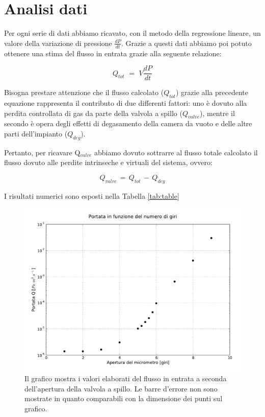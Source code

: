 \section{Analisi dati}

Per ogni serie di dati abbiamo ricavato, con il metodo della regressione lineare, un valore della variazione di pressione $\frac{dP}{dt}$. Grazie a questi dati abbiamo poi potuto ottenere una stima del flusso in entrata grazie alla seguente relazione:

\begin{equation}
	Q_{tot} \,\, = \,\, V \frac{dP}{dt}
\end{equation}

Bisogna prestare attenzione che il flusso calcolato ($Q_{tot}$) grazie alla precedente equazione rappresenta il contributo di due differenti fattori: uno è dovuto alla perdita controllata di gas da parte della valvola a spillo ($Q_{valve}$), mentre il secondo è opera degli effetti di degasamento della camera da vuoto e delle altre parti dell'impianto ($Q_{deg}$).

Pertanto, per ricavare Q$_{valve}$ abbiamo dovuto sottrarre al flusso totale calcolato il flusso  dovuto alle perdite intrinseche e virtuali del sistema, ovvero:

\begin{equation}
	Q_{valve} \, = \, Q_{tot} \, - \, Q_{deg}
\end{equation}

I risultati numerici sono esposti nella Tabella \ref{tab:table}

\begin{figure}[h!]
    \includegraphics[width=16cm]{graph.pdf}
    \caption{Il grafico mostra i valori elaborati del flusso in entrata a seconda dell'apertura della valvola a spillo. Le barre d'errore non sono
    mostrate in quanto comparabili con la dimensione dei punti sul grafico.}
    \label{fig:graph}
\end{figure}
